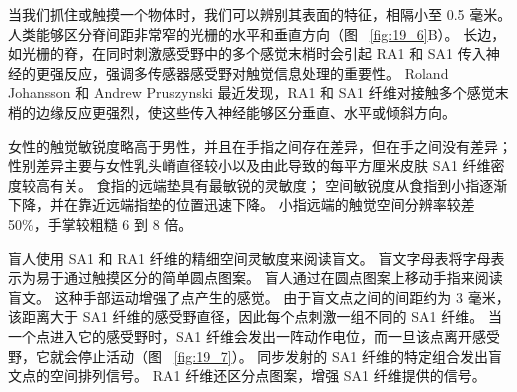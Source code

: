 当我们抓住或触摸一个物体时，我们可以辨别其表面的特征，相隔小至 0.5 毫米。
人类能够区分脊间距非常窄的光栅的水平和垂直方向（图 ~\ref{fig:19_6}B）。
长边，如光栅的脊，在同时刺激感受野中的多个感觉末梢时会引起 RA1 和 SA1 传入神经的更强反应，强调多传感器感受野对触觉信息处理的重要性。
Roland Johansson 和 Andrew Pruszynski 最近发现，RA1 和 SA1 纤维对接触多个感觉末梢的边缘反应更强烈，使这些传入神经能够区分垂直、水平或倾斜方向。


女性的触觉敏锐度略高于男性，并且在手指之间存在差异，但在手之间没有差异；
性别差异主要与女性乳头嵴直径较小以及由此导致的每平方厘米皮肤 SA1 纤维密度较高有关。
食指的远端垫具有最敏锐的灵敏度；
空间敏锐度从食指到小指逐渐下降，并在靠近远端指垫的位置迅速下降。
小指远端的触觉空间分辨率较差 50\%，手掌较粗糙 6 到 8 倍。


盲人使用 SA1 和 RA1 纤维的精细空间灵敏度来阅读盲文。
盲文字母表将字母表示为易于通过触摸区分的简单圆点图案。
盲人通过在圆点图案上移动手指来阅读盲文。
这种手部运动增强了点产生的感觉。
由于盲文点之间的间距约为 3 毫米，该距离大于 SA1 纤维的感受野直径，因此每个点刺激一组不同的 SA1 纤维。
当一个点进入它的感受野时，SA1 纤维会发出一阵动作电位，而一旦该点离开感受野，它就会停止活动（图 ~\ref{fig:19_7}）。
同步发射的 SA1 纤维的特定组合发出盲文点的空间排列信号。
RA1 纤维还区分点图案，增强 SA1 纤维提供的信号。


